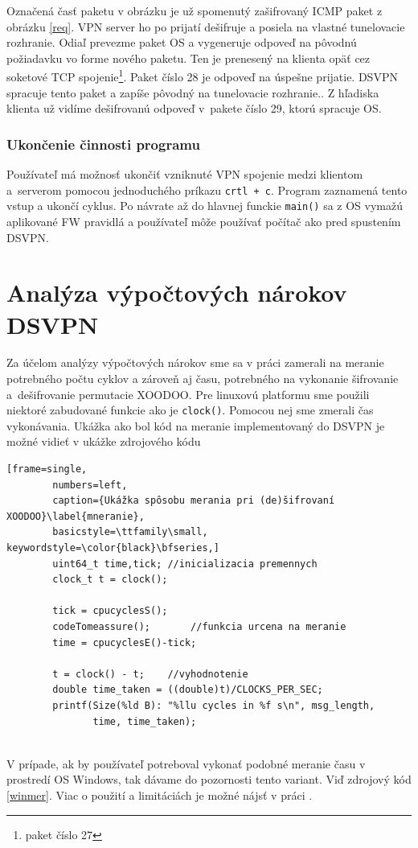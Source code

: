 Označená časť paketu v obrázku je už spomenutý zašifrovaný ICMP paket z obrázku \ref{req}. VPN server ho po prijatí dešifruje a posiela na vlastné tunelovacie rozhranie. Odiaľ prevezme paket OS a vygeneruje odpoveď na pôvodnú požiadavku vo forme nového paketu. Ten je prenesený na klienta opäť cez soketové TCP spojenie\footnote{paket číslo 27}. Paket číslo 28 je odpoveď na úspešne prijatie. DSVPN spracuje tento paket a zapíše pôvodný na tunelovacie rozhranie.. Z hľadiska klienta už vidíme dešifrovanú odpoveď v~pakete číslo 29, ktorú spracuje OS.

  
\subsubsection{Ukončenie činnosti programu}
Používateľ má možnosť ukončiť vzniknuté VPN spojenie medzi klientom a~serverom pomocou jednoduchého príkazu \lstinline|crtl + c|. Program zaznamená tento \\vstup a ukončí cyklus. Po návrate až do hlavnej funckie \lstinline|main()| sa z OS vymažú aplikované FW pravidlá a používateľ môže používať počítač ako pred spustením DSVPN.

\section{Analýza výpočtových nárokov DSVPN}\label{analyza}
Za účelom analýzy výpočtových nárokov sme sa v práci zamerali na meranie potrebného počtu cyklov a zároveň aj času, potrebného na vykonanie šifrovanie a~dešifrovanie permutacie XOODOO. Pre linuxovú platformu sme použili niektoré zabudované funkcie ako je \lstinline|clock()|. Pomocou nej sme zmerali čas vykonávania. Ukážka ako bol kód na meranie implementovaný do DSVPN je možné vidieť v ukážke zdrojového kódu
 
\begin{minipage}{\linewidth} 	
	\begin{lstlisting}[frame=single,
		numbers=left,
		caption={Ukážka spôsobu merania pri (de)šifrovaní XOODOO}\label{mneranie},
		basicstyle=\ttfamily\small, keywordstyle=\color{black}\bfseries,]
		uint64_t time,tick;	//inicializacia premennych
		clock_t t = clock();
		
		tick = cpucyclesS();
		codeTomeassure();		//funkcia urcena na meranie
		time = cpucyclesE()-tick;
		
		t = clock() - t;    //vyhodnotenie
		double time_taken = ((double)t)/CLOCKS_PER_SEC;
		printf(Size(%ld B): "%llu cycles in %f s\n", msg_length,
		       time, time_taken);	
	\end{lstlisting}
\end{minipage}\\
V prípade, ak by používateľ potreboval vykonať podobné meranie času v prostredí OS Windows, tak dávame do pozornosti tento variant. Viď zdrojový kód \ref{winmer}. Viac o použití a limitáciách je možné nájsť v práci \cite{bc}.

